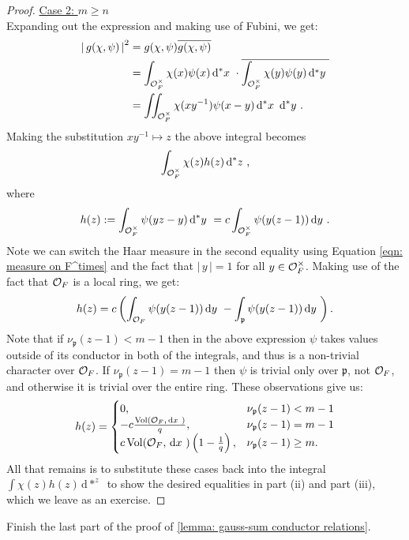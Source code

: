\documentclass[11pt, x11names]{article}
\newcommand{\pp}{\mathfrak{p}}
\renewcommand{\bar}[1]{\overline{#1}}
\renewcommand{\brack}[1]{\left(   #1 \right)}
\newcommand{\abs}[1]{\left| \, #1  \,\right|}
\newcommand{\inv}[1]{#1^{-1}}
\newcommand{\dx}{\, \mathrm{d}x \ }
\newcommand{\dy}{\, \mathrm{d}y \ }
\renewcommand{\d}[1]{\, \mathrm{d}#1 \ }
\DeclareMathOperator{\vol}{Vol}
\begin{document}
\begin{proof}
\underline{Case 2: $m \geq n$}\\
Expanding out the expression and making use of Fubini, we get:
\begin{align*}
    \abs{g(\chi, \psi)}^2 &= g(\chi, \psi) \bar{g(\chi, \psi)}\\
    &= \int_{\calo_F^\times} \chi(x) \psi(x) \d{^*x} \cdot \bar{\int_{\calo_F^\times} \chi(y) \psi(y) \d{^*y}}\\
    &= \iint_{\calo_F^\times} \chi(x\inv{y})\psi(x-y)  \d{^*x} \d{^*y}.
\end{align*}
Making the substitution $x\inv{y} \mapsto z$ the above integral becomes
\begin{equation*}
    \int_{\calo_F^\times} \chi(z) h(z) \d{^*z},
\end{equation*}
where 
\begin{equation*}
    h(z) := \int_{\calo_F^\times} \psi(yz - y)\d{^*y} = c \int_{\calo_F^\times} \psi(y(z-1)) \dy.
\end{equation*}
Note we can switch the Haar measure in the second equality using Equation \ref{eqn: measure on F^times} and the fact that $\abs{y} = 1$ for all $y \in \mathcal{O}_F^\times$. Making use of the fact that $\mathcal{O}_F$ is a local ring, we get:
\begin{equation*}
    h(z) = c \brack{\int_{\calo_F} \psi(y(z - 1)) \dy - \int_\pp \psi(y(z - 1)) \dy}.
\end{equation*}
Note that if $\nu_\pp(z-1)  <  m-1$ then in the above expression $\psi$ takes values outside of its conductor in both of the integrals, and thus is a non-trivial character over $\mathcal{O}_F$. If $\nu_\pp(z-1) = m - 1$ then $\psi$ is trivial only over $\pp$, not $\mathcal{O}_F$, and otherwise it is trivial over the entire ring. These observations give us:
\begin{equation*}
    h(z) = \begin{cases}
        0, & \nu_\pp(z-1) < m-1\\
        -c\frac{\vol(\calo_F, \dx)}{q}, & \nu_\pp(z-1) = m-1\\
        c\vol(\calo_F, \dx)\brack{1 - \frac{1}{q}}, &   \nu_\pp(z-1) \geq m.
    \end{cases}
\end{equation*}
All that remains is to substitute these cases back into the integral $\int \chi(z)h(z) \d{*^z}$ to show the desired equalities in part (ii) and part (iii), which we leave as an exercise.
\end{proof}

\begin{exercise}
\label{exercise: last part of gauss-sum conductor proof}
Finish the last part of the proof of \ref{lemma: gauss-sum conductor relations}.
\end{exercise}
\end{document}
